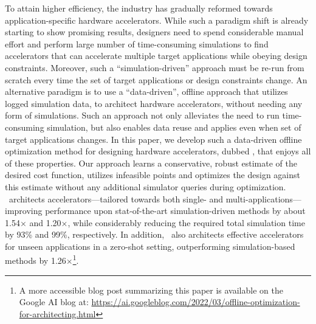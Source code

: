\documentclass[../thesis.tex]{subfiles}
\begin{document}

% 

% 
% 
% 
% 
% 
% 

%
To attain higher efficiency, the industry has gradually reformed towards application-specific hardware accelerators.
%
While such a paradigm shift is already starting to show promising results, designers need to spend considerable manual effort and perform large number of time-consuming simulations to find accelerators that can accelerate multiple target applications while obeying design constraints.
%
Moreover, such a ``simulation-driven'' approach must be re-run from scratch every time the set of target applications or design constraints change. 
%
An alternative paradigm is to use a ``data-driven'', offline approach that utilizes logged simulation data, to architect hardware accelerators, without needing any form of simulations.
%
Such an approach not only alleviates the need to run time-consuming simulation, but also enables data reuse and applies even when set of target applications changes.
%
In this paper, we develop such a data-driven offline optimization method for designing hardware accelerators, dubbed \primemethodname, that enjoys all of these properties.
%
Our approach learns a conservative, robust estimate of the desired cost function, utilizes infeasible points and optimizes the design against this estimate without any additional simulator queries during optimization.
%
\primemethodname\ architects accelerators---tailored towards both single- and multi-applications---improving performance upon stat-of-the-art simulation-driven methods by about 1.54$\times$ and 1.20$\times$, while considerably reducing the required total simulation time by 93\% and 99\%, respectively.
%
In addition, \primemethodname\ also architects effective accelerators for unseen applications in a zero-shot setting, outperforming simulation-based methods by 1.26$\times$\footnote{A more accessible blog post summarizing this paper is available on the Google AI blog at: \url{https://ai.googleblog.com/2022/03/offline-optimization-for-architecting.html}}.
%








\end{document}
